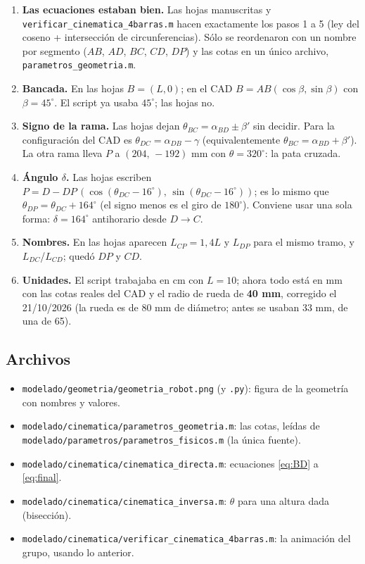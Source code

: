 \documentclass[11pt,a4paper]{article}
\begin{document}
\begin{enumerate}[nosep]
\item \textbf{Las ecuaciones estaban bien.} Las hojas manuscritas y \texttt{verificar\_cinematica\_4barras.m}
hacen exactamente los pasos 1 a 5 (ley del coseno + intersección de circunferencias). Sólo se
reordenaron con un nombre por segmento (\(AB\), \(AD\), \(BC\), \(CD\), \(DP\)) y las cotas en un único
archivo, \texttt{parametros\_geometria.m}.
\item \textbf{Bancada.} En las hojas \(B=(L,0)\); en el CAD \(B=AB(\cos\beta,\sin\beta)\) con
\(\beta=45^\circ\). El script ya usaba \(45^\circ\); las hojas no.
\item \textbf{Signo de la rama.} Las hojas dejan \(\theta_{BC}=\alpha_{BD}\pm\beta'\) sin decidir. Para
la configuración del CAD es \(\theta_{DC}=\alpha_{DB}-\gamma\) (equivalentemente
\(\theta_{BC}=\alpha_{BD}+\beta'\)). La otra rama lleva \(P\) a \((204,\,-192)\) mm con
\(\theta=320^\circ\): la pata cruzada.
\item \textbf{Ángulo \(\delta\).} Las hojas escriben \(P=D-DP\,(\cos(\theta_{DC}-16^\circ),\,\sin(\theta_{DC}-16^\circ))\);
es lo mismo que \(\theta_{DP}=\theta_{DC}+164^\circ\) (el signo menos es el giro de \(180^\circ\)).
Conviene usar una sola forma: \(\delta=164^\circ\) antihorario desde \(D\!\to\!C\).
\item \textbf{Nombres.} En las hojas aparecen \(L_{CP}=1{,}4L\) y \(L_{DP}\) para el mismo tramo, y
\(L_{DC}\)/\(L_{CD}\); quedó \(DP\) y \(CD\).
\item \textbf{Unidades.} El script trabajaba en cm con \(L=10\); ahora todo está en mm con las cotas
reales del CAD y el radio de rueda de \textbf{40 mm}, corregido el 21/10/2026 (la rueda es de 80 mm de diámetro; antes se usaban 33 mm, de una de 65).
\end{enumerate}

\subsection*{Archivos}
\begin{itemize}[nosep]
\item \texttt{modelado/geometria/geometria\_robot.png} (y \texttt{.py}): figura de la geometría con nombres y valores.
\item \texttt{modelado/cinematica/parametros\_geometria.m}: las cotas, leídas de \texttt{modelado/parametros/parametros\_fisicos.m} (la única fuente).
\item \texttt{modelado/cinematica/cinematica\_directa.m}: ecuaciones \eqref{eq:BD} a \eqref{eq:final}.
\item \texttt{modelado/cinematica/cinematica\_inversa.m}: \(\theta\) para una altura dada (bisección).
\item \texttt{modelado/cinematica/verificar\_cinematica\_4barras.m}: la animación del grupo, usando lo anterior.
\end{itemize}
\end{document}
